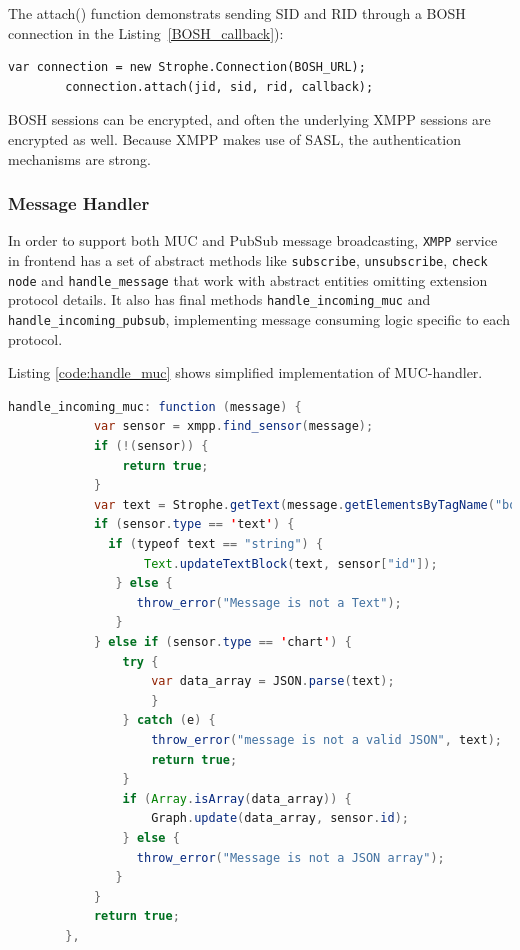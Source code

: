 The attach() function demonstrats sending SID and RID through a BOSH connection in the Listing~\ref{BOSH_callback}):
	    \begin{lstlisting}[label=BOSH_callback,caption=BOSH Callback]
		var connection = new Strophe.Connection(BOSH_URL);
        connection.attach(jid, sid, rid, callback);
	    \end{lstlisting}

BOSH sessions can be encrypted, and often the underlying XMPP sessions are encrypted as well. Because XMPP makes use of SASL, the authentication mechanisms are strong.

\subsubsection{Message Handler}
In order to support both MUC and PubSub message broadcasting, \verb|XMPP| service in frontend has a set of abstract methods like \verb|subscribe|, \verb|unsubscribe|, \verb|check node| and \verb|handle_message| that work with abstract entities omitting extension protocol details. It also has final methods \verb|handle_incoming_muc| and \verb|handle_incoming_pubsub|, implementing message consuming logic specific to each protocol.

Listing \ref{code:handle_muc} shows simplified implementation of MUC-handler.

\begin{lstlisting}[language=java,label=code:handle_muc,caption=Simplified MUC handler]
	handle_incoming_muc: function (message) {
            var sensor = xmpp.find_sensor(message);
            if (!(sensor)) {
                return true;
            }
            var text = Strophe.getText(message.getElementsByTagName("body")[0]);
            if (sensor.type == 'text') {
              if (typeof text == "string") {
                   Text.updateTextBlock(text, sensor["id"]);
               } else {
                  throw_error("Message is not a Text");
               }
            } else if (sensor.type == 'chart') {
                try {
                    var data_array = JSON.parse(text);
                    }
                } catch (e) {
                    throw_error("message is not a valid JSON", text);
                    return true;
                }
                if (Array.isArray(data_array)) {
                    Graph.update(data_array, sensor.id);
                } else {
                  throw_error("Message is not a JSON array");
               }
            }
            return true;
        },
\end{lstlisting}

